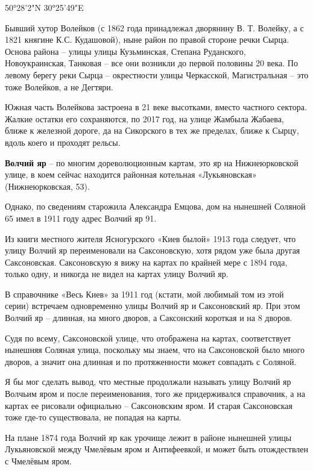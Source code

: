 50°28'2"N 30°25'49"E

Бывший хутор Волейков (с 1862 года принадлежал дворянину В. Т. Волейку, а с 1821 княгине К.С. Кудашовой), ныне район по правой стороне речки Сырца. Основа района – улицы улицы Кузьминская, Степана Руданского, Новоукраинская, Танковая – все они возникли до первой половины 20 века. По левому берегу реки Сырца – окрестности улицы Черкасской, Магистральная – это тоже Волейков, а не Дегтяри.

Южная часть Волейкова застроена в 21 веке высотками, вместо частного сектора. Жалкие остатки его сохраняются, по 2017 год, на улице Жамбыла Жабаева, ближе к железной дороге, да на Сикорского в тех же пределах, ближе к Сырцу, вдоль коего и проходят рельсы.\\

\medskip

\textbf{Волчий яр} – по многим  дореволюционным картам, это яр на Нижнеюрковской улице, в коем сейчас находится районная котельная «Лукьяновская» (Нижнеюрковская, 53). 

Однако, по сведениям старожила Александ\-ра Емцова, дом на нынешней Соляной 65 имел в 1911 году адрес Волчий яр 91. 

Из книги местного жителя Ясногурского «Киев былой» 1913 года следует, что улицу Волчий яр переименовали на Саксоновскую, хотя рядом уже была другая Саксоновская. Саксоновскую я вижу на картах по крайней мере с 1894 года, только одну, и никогда не видел на картах улицу Волчий яр. 

В справочнике «Весь Киев» за 1911 год (кстати, мой любимый том из этой серии) встречаем одновременно улицы Волчий яр и Саксоновский яр. При этом Волчий яр – длинная, на много дворов, а Саксонский короткая и на 8 дворов.

Судя по всему, Саксоновской улице, что отображена на картах, соответствует нынешняя Соляная улица, поскольку мы знаем, что на Саксоновской было много дворов, а значит она длинная и по протяженности может совпадать с Соляной.

Я бы мог сделать вывод, что местные продолжали называть улицу Волчий яр Волчьим яром и после переименования, того же придерживался справочник, а на картах ее рисовали официально – Саксоновским яром. И старая Саксоновская тоже где-то существовала, не попадая на карты. 

На плане 1874 года Волчий яр как урочище лежит в районе нынешней улицы Лукьяновской между Чмелёвым яром и Антифеевкой, и может быть отождествлен с Чмелёвым яром.

